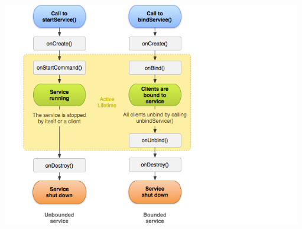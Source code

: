 \documentclass[9pt, b5paper]{article}
\begin{document}
\includegraphics[width=.9\linewidth]{./pic/servicelifecycle.png}
\end{document}
